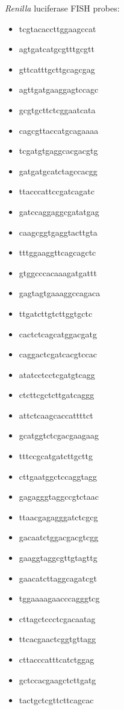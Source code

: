 \textit{Renilla} luciferase FISH probes:
\begin{itemize}
    \itemsep-0.5em
    \item tcgtacaccttggaagccat
    \item agtgatcatgcgtttgcgtt
    \item gttcatttgcttgcagcgag
    \item agttgatgaaggagtccagc
    \item gcgtgcttctcggaatcata
    \item cagcgttaccatgcagaaaa
    \item tcgatgtgaggcacgacgtg
    \item gatgatgcatctagccacgg
    \item ttacccattccgatcagatc
    \item gatccaggaggcgatatgag
    \item caagcggtgaggtacttgta
    \item tttggaaggttcagcagctc
    \item gtggcccacaaagatgattt
    \item gagtagtgaaaggccagaca
    \item ttgatcttgtcttggtgctc
    \item cactctcagcatggacgatg
    \item caggactcgatcacgtccac
    \item atatcctcctcgatgtcagg
    \item ctcttcgctcttgatcaggg
    \item attctcaagcaccattttct
    \item gcatggtctcgacgaagaag
    \item tttccgcatgatcttgcttg
    \item cttgaatggctccaggtagg
    \item gagagggtaggccgtctaac
    \item ttaacgagagggatctcgcg
    \item gacaatctggacgacgtcgg
    \item gaaggtaggcgttgtagttg
    \item gaacatcttaggcagatcgt
    \item tggaaaagaacccagggtcg
    \item cttagctccctcgacaatag
    \item ttcacgaactcggtgttagg
    \item cttacccatttcatctggag
    \item gctccacgaagctcttgatg
    \item tactgctcgttcttcagcac
\end{itemize}


